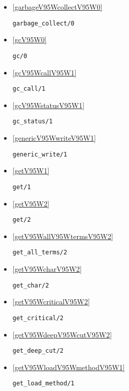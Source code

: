 \begin{itemize}
\item \ref{garbageV95WcollectV95W0} 
\begin{verbatim}
garbage_collect/0
\end{verbatim}

\item \ref{gcV95W0} 
\begin{verbatim}
gc/0
\end{verbatim}

\item \ref{gcV95WcallV95W1} 
\begin{verbatim}
gc_call/1
\end{verbatim}

\item \ref{gcV95WstatusV95W1} 
\begin{verbatim}
gc_status/1
\end{verbatim}

\item \ref{genericV95WwriteV95W1} 
\begin{verbatim}
generic_write/1
\end{verbatim}

\item \ref{getV95W1} 
\begin{verbatim}
get/1
\end{verbatim}

\item \ref{getV95W2} 
\begin{verbatim}
get/2
\end{verbatim}

\item \ref{getV95WallV95WtermsV95W2} 
\begin{verbatim}
get_all_terms/2
\end{verbatim}

\item \ref{getV95WcharV95W2} 
\begin{verbatim}
get_char/2
\end{verbatim}

\item \ref{getV95WcriticalV95W2} 
\begin{verbatim}
get_critical/2
\end{verbatim}

\item \ref{getV95WdeepV95WcutV95W2} 
\begin{verbatim}
get_deep_cut/2
\end{verbatim}

\item \ref{getV95WloadV95WmethodV95W1} 
\begin{verbatim}
get_load_method/1
\end{verbatim}


\end{itemize}
